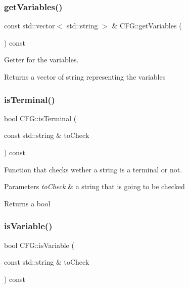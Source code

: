 \subsubsection{\texorpdfstring{get\+Variables()}{getVariables()}}
{\footnotesize\ttfamily const std\+::vector$<$ std\+::string $>$ \& C\+F\+G\+::get\+Variables (\begin{DoxyParamCaption}{ }\end{DoxyParamCaption}) const}



Getter for the variables. 

\begin{DoxyReturn}{Returns}
a vector of string representing the variables 
\end{DoxyReturn}
\mbox{\label{classCFG_ae3e42c620977ec6075dae6c8328f0c30}} 
\subsubsection{\texorpdfstring{is\+Terminal()}{isTerminal()}}
{\footnotesize\ttfamily bool C\+F\+G\+::is\+Terminal (\begin{DoxyParamCaption}\item[{const std\+::string \&}]{to\+Check }\end{DoxyParamCaption}) const}



Function that checks wether a string is a terminal or not. 


\begin{DoxyParams}{Parameters}
{\em to\+Check} & a string that is going to be checked \\
\hline
\end{DoxyParams}
\begin{DoxyReturn}{Returns}
a bool 
\end{DoxyReturn}
\mbox{\label{classCFG_a909dec00a27b31ff8522e9300edcd593}} 
\subsubsection{\texorpdfstring{is\+Variable()}{isVariable()}}
{\footnotesize\ttfamily bool C\+F\+G\+::is\+Variable (\begin{DoxyParamCaption}\item[{const std\+::string \&}]{to\+Check }\end{DoxyParamCaption}) const}



